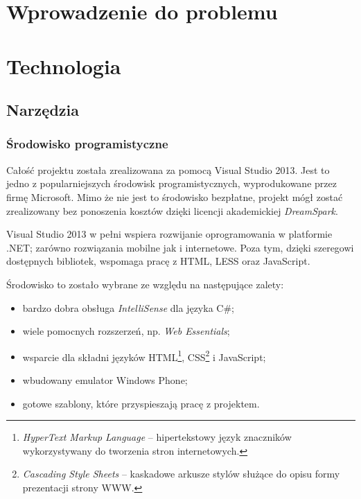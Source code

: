 \documentclass{book}
\begin{document}
	
	
	
	\chapter{Wprowadzenie do problemu}
	\label{id:cha:wprowadzenie}
	
	\chapter{Technologia}
	\label{id:cha:technologia}
	
	
		\section{Narzędzia}		
			\subsection{Środowisko programistyczne}
				
			Całość projektu została zrealizowana za pomocą Visual Studio 2013. Jest to jedno z popularniejszych środowisk programistycznych, wyprodukowane przez firmę Microsoft. Mimo że nie jest to środowisko bezpłatne, projekt mógł zostać zrealizowany bez ponoszenia kosztów dzięki licencji akademickiej \textit{DreamSpark}. 
			
			Visual Studio 2013 w pełni wspiera rozwijanie oprogramowania w platformie .NET; zarówno rozwiązania mobilne jak i internetowe. Poza tym, dzięki szeregowi dostępnych bibliotek, wspomaga pracę z HTML, LESS oraz JavaScript.
			
			Środowisko to zostało wybrane ze względu na następujące zalety:
			\begin{itemize}
				\item bardzo  dobra obsługa \textit{IntelliSense} dla języka C\#;
				\item wiele pomocnych rozszerzeń, np. \textit{Web Essentials};
				\item wsparcie dla składni języków HTML\footnote{\emph{HyperText Markup Language} -- hipertekstowy język znaczników wykorzystywany do tworzenia stron internetowych.}, CSS\footnote{\emph{Cascading Style Sheets} -- kaskadowe arkusze stylów służące do opisu formy prezentacji strony WWW.} i JavaScript;
				\item wbudowany emulator Windows Phone;
				\item gotowe szablony, które przyspieszają pracę z projektem.
			\end{itemize}
			
\end{document}
